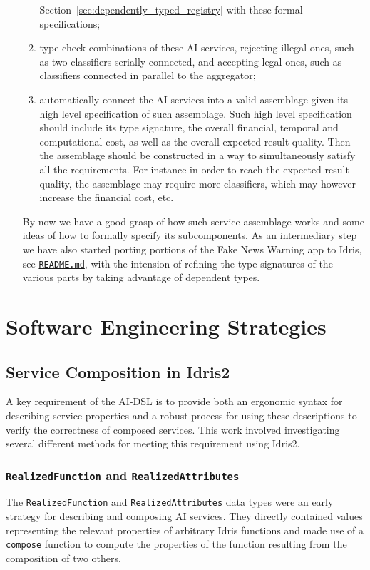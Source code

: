 \documentclass[]{report}
\begin{document}
\begin{itemize}
\begin{enumerate}
    Section~\ref{sec:dependently_typed_registry} with these formal
    specifications;
  \item type check combinations of these AI services, rejecting
    illegal ones, such as two classifiers serially connected, and
    accepting legal ones, such as classifiers connected in parallel to
    the aggregator;
  \item automatically connect the AI services into a valid assemblage
    given its high level specification of such assemblage.  Such high
    level specification should include its type signature, the overall
    financial, temporal and computational cost, as well as the overall
    expected result quality.  Then the assemblage should be
    constructed in a way to simultaneously satisfy all the
    requirements.  For instance in order to reach the expected result
    quality, the assemblage may require more classifiers, which may
    however increase the financial cost, etc.
  \end{enumerate}
  By now we have a good grasp of how such service assemblage works and
  some ideas of how to formally specify its subcomponents.  As an
  intermediary step we have also started porting portions of the Fake
  News Warning app to Idris, see
  \href{https://github.com/singnet/ai-dsl/blob/master/ai-algorithms/NeuralNets/README.md}{\texttt{README.md}},
  with the intension of refining the type signatures of the various
  parts by taking advantage of dependent types.
\end{itemize}

\chapter{Software Engineering Strategies}
\label{chap:soft_eng_strat}
\section{Service Composition in Idris2}
\label{sec:service_composition_in_idris2}

A key requirement of the AI-DSL is to provide both an ergonomic syntax for
describing service properties and a robust process for using these descriptions
to verify the correctness of composed services.  This work involved
investigating several different methods for meeting this requirement using
Idris2.

\subsection{\texttt{RealizedFunction} and \texttt{RealizedAttributes}}
The \texttt{RealizedFunction} and \texttt{RealizedAttributes} data types were an
early strategy for describing and composing AI services.  They directly
contained values representing the relevant properties of arbitrary Idris
functions and made use of a \texttt{compose} function to compute the properties
of the function resulting from the composition of two others.
\end{document}
